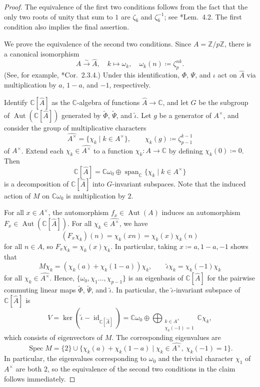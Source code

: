 \documentclass[12pt]{amsart}
\theoremstyle{definition}
\theoremstyle{remark}
\newcommand{\Id}{\operatorname{id}}
\newcommand{\C}{\mathbb{C}}
\newcommand{\Z}{\mathbb{Z}}
\newcommand{\A}{\widehat{A}}
\newcommand{\PHI}{\widetilde{\Phi}}
\newcommand{\PSI}{\widetilde{\Psi}}
\newcommand{\inv}{^{-1}}
\def\Aut{\operatorname{Aut}}
\begin{document}
\begin{proof}
    The equivalence of the first two conditions follows from the fact that the only two roots of unity that sum to $1$ are $\zeta_6$ and $\zeta_6\inv$; see \cite{counterexample}*{Lem.\ 4.2}. The first condition also implies the final assertion.

    We prove the equivalence of the second two conditions. Since $A=\Z/p\Z$, there is a canonical isomorphism \[A\xrightarrow{\sim}\A,\quad k\mapsto\omega_k,\quad \omega_k(n)\coloneq\zeta_p^{nk}.\] (See, for example, \cite{fourier}*{Cor.\ 2.3.4}.) 
    Under this identification, $\Phi$, $\Psi$, and $\iota$ act on $\A$ via multiplication by $a$, $1-a$, and $-1$, respectively. 
    
    Identify $\C[\A]$ as the $\C$-algebra of functions $\A\to\C$, and let $G$ be the subgroup of $\Aut(\C[\A])$ generated by $\PHI$, $\PSI$, and $\tilde\iota$. 
    Let $g$ be a generator of $A^\times$, and consider the group of multiplicative characters 
    \[\widehat{A^\times}=\{\chi_k\mid k\in A^\times\},\qquad \chi_k(g)\coloneq\zeta_{p-1}^{k-1}\] 
    of $A^\times$. Extend each $\chi_k\in\widehat{A^\times}$ to a function $\chi_k\colon A\to\C$ by defining $\chi_k(0)\coloneq 0$. Then 
    \[
    \C[\A]=\C\omega_0\oplus\operatorname{span}_\C\{\chi_k\mid k\in A^\times\}
    \]
    is a decomposition of $\C[\A]$ into $G$-invariant subspaces.
    Note that the induced action of $M$ on $\C\omega_0$ is multiplication by $2$. 

    For all $x\in A^\times$, the automorphism $f_x\in\Aut(A)$ induces an automorphism $F_x\in\Aut(\C[\A])$. For all $\chi_k\in\widehat{A^\times}$, we have
    \[
    (F_x\chi_k)(n)=\chi_k(xn)=\chi_k(x)\chi_k(n)
    \]
    for all $n\in A$, so $F_x\chi_k=\chi_k(x)\chi_k$. In particular, taking $x\coloneq a,1-a,-1$ shows that
    \[
    M\chi_k=(\chi_k(a)+\chi_k(1-a))\chi_k,\qquad \tilde\iota\chi_k=\chi_k(-1)\chi_k
    \]
    for all $\chi_k\in\widehat{A^\times}$. Hence, $\{\omega_0,\chi_1\dots,\chi_{p-1}\}$ is an eigenbasis of $\C[\A]$ for the pairwise commuting linear maps $\PHI$, $\PSI$, and $\tilde\iota$. In particular, the $\tilde\iota$-invariant subspace of $\C[\A]$ is
    \[
    V=\ker(\tilde\iota-\Id_{\C[\A]})=\C\omega_0\oplus\bigoplus_{\substack{k\in A^\times\\\chi_k(-1)=1}}\C\chi_k,
    \]
    which consists of eigenvectors of $M$. The corresponding eigenvalues are 
    \[
    \operatorname{Spec}M=\{2\}\cup\{\chi_k(a)+\chi_k(1-a)\mid \chi_k\in \widehat{A^\times},\ \chi_k(-1)=1\}.
    \]
    In particular, the eigenvalues corresponding to $\omega_0$ and the trivial character $\chi_1$ of $A^\times$ are both $2$, so the equivalence of the second two conditions in the claim follows immediately.
\end{proof}
\end{document}
